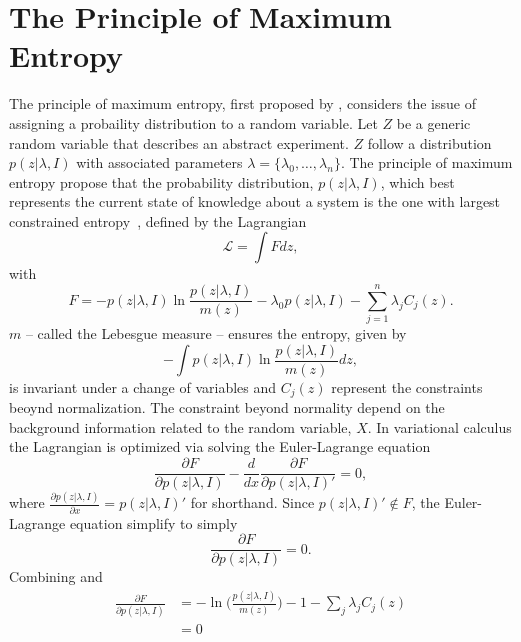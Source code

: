 \section{The Principle of Maximum Entropy}
\label{sec:maxent}
The principle of maximum entropy, first proposed by \citet{Jaynes1957}, considers the issue of assigning a probaility distribution to a random variable. Let $Z$ be a generic random variable that describes an abstract experiment. $Z$ follow a distribution $p(z|\lambda, I)$ with associated parameters $\lambda = \{\lambda_0,\dots ,\lambda_n\}$. The principle of maximum entropy propose that the probability distribution, $p(z|\lambda, I)$, which best represents the current state of knowledge about a system is the one with largest constrained entropy~\citep{Sivia2006}, defined by the Lagrangian
\begin{equation}
	\mathcal{L} = \int F dz,
	\label{eq:Q}
\end{equation}
with
\begin{equation}
	F= -p(z|\lambda, I)\ln\frac{p(z|\lambda, I)}{m(z)}-\lambda_0 p(z|\lambda, I)-\sum_{j=1}^{n}\lambda_jC_j(z).
\end{equation}
$m$ -- called the Lebesgue measure -- ensures the entropy, given by 
\begin{equation}
	-\int p(z|\lambda, I)\ln\frac{p(z|\lambda, I)}{m(z)} dz,
\end{equation}
is invariant under a change of variables and $C_j(z)$ represent the constraints beoynd normalization. The constraint beyond normality depend on the background information related to the random variable, $X$. In variational calculus the Lagrangian is optimized via solving the Euler-Lagrange equation
\begin{equation}
	\frac{\partial F}{\partial p(z|\lambda, I)}-\frac{d}{dx}\frac{\partial F}{\partial p(z|\lambda, I)'}=0,
\end{equation}
where $\frac{\partial p(z|\lambda, I)}{\partial x} = p(z|\lambda, I)'$ for shorthand. Since $p(z|\lambda, I)'\notin F$, the Euler-Lagrange equation simplify to simply
\begin{equation}
	\frac{\partial F}{\partial p(z|\lambda, I)}=0.
	\label{eq:f}
\end{equation}
Combining  and 
\begin{equation}
	\begin{split}
		\frac{\partial F}{\partial p(z|\lambda, I)}&= -\ln\bigg(\frac{p(z|\lambda, I)}{m(z)}\bigg)-1-\sum_{j}\lambda_{j}C_j(z)\\
		&=0
	\end{split}
\end{equation}
